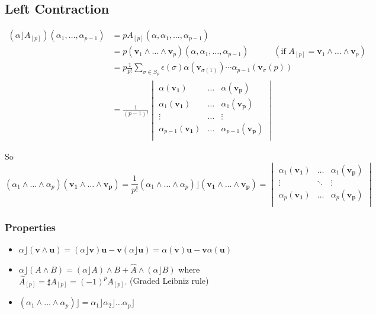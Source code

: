 \documentclass[12pt]{article}
\begin{document}
\subsection*{Left Contraction}
$$\begin{aligned}
    (\alpha\rfloor A_{[p]})(\alpha_1, \ldots, \alpha_{p-1}) &= p A_{[p]}(\alpha,\alpha_1, \ldots, \alpha_{p-1}) \\
      &= p (\bm{v}_1 \wedge \ldots \wedge \bm{v}_p)(\alpha,\alpha_1, \ldots, \alpha_{p-1} ) \quad \quad \quad (\text{if } A_{[p]} = \bm{v}_1 \wedge \ldots \wedge \bm{v}_p ) \\
      &= p \frac{1}{p!} \sum_{\sigma \in S_p} \epsilon(\sigma) \alpha(\bm{v}_{\sigma(1)}) \cdots \alpha_{p-1}(\bm{v}_\sigma(p)) \\
      &=\frac{1}{(p-1)!} \begin{vmatrix}
      	\alpha(\bm{v_1}) & \ldots & \alpha(\bm{v_p}) \\
      	\alpha_1(\bm{v_1}) & \ldots & \alpha_1(\bm{v_p}) \\
      	\vdots & \ldots & \vdots \\
      	\alpha_{p-1}(\bm{v_1}) & \ldots & \alpha_{p-1}(\bm{v_p}) \\
      \end{vmatrix}
\end{aligned}$$

So $$
  (\alpha_1 \wedge \ldots \wedge\alpha_p)(\bm{v_1}\wedge \ldots \wedge \bm{v_p}) = \frac{1}{p!}  (\alpha_1 \wedge \ldots  \wedge \alpha_p)\rfloor (\bm{v_1}\wedge \ldots \wedge \bm{v_p}) = 
  \begin{vmatrix}
  \alpha_1(\bm{v_1}) & \ldots & \alpha_1(\bm{v_p}) \\
  \vdots & \ddots & \vdots \\
  \alpha_p(\bm{v_1}) & \ldots & \alpha_p(\bm{v_p}) \\
  \end{vmatrix}
$$

\subsubsection*{Properties}
\begin{itemize}
	\item $\alpha \rfloor (\bm{v} \wedge \bm{u}) = (\alpha \rfloor \bm{v}) \bm{u} - \bm{v} (\alpha \rfloor \bm{u}) = \alpha(\bm{v}) \bm{u} - \bm{v} \alpha(\bm{u}) $
	\item $\alpha \rfloor (A \wedge B) = (\alpha \rfloor A) \wedge B +  \hat{A} \wedge (\alpha \rfloor B)$ where $\hat{A}_{[p]} = \sharp A_{[p]} = (-1)^p A_{[p]}.$ (Graded Leibniz rule)
	\item $(\alpha_1 \wedge \ldots \wedge \alpha_p) \rfloor = \alpha_1 \rfloor  \alpha_2 \rfloor \ldots \alpha_p \rfloor$
\end{itemize}
\end{document}
